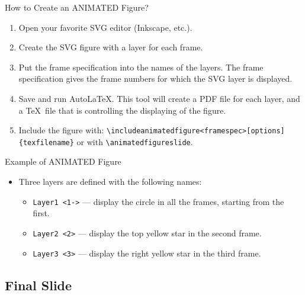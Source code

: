 \documentclass[english,sectioncirclenumberstyle]{le2iutbmbeamer}
\begin{document}
\begin{frame}{How to Create an ANIMATED Figure?}
	\smaller
	\begin{enumerate}
	\item Open your favorite SVG editor (Inkscape, etc.).
	\item Create the SVG figure with a layer for each frame.
	\item Put the frame specification into the names of the layers. The frame specification gives the frame numbers for which the SVG layer is displayed. 
	\item Save and run AutoLaTeX. This tool will create a PDF file for each layer, and a \TeX\ file that is controlling the displaying of the figure.
	\item Include the figure with: \texttt{{\textbackslash}includeanimatedfigure<framespec>[options]\{texfilename\}} or with \texttt{{\textbackslash}animatedfigureslide}.
	\end{enumerate}
\end{frame}

\begin{frame}{Example of ANIMATED Figure}
	\begin{itemize}
	\item Three layers are defined with the following names:
		\begin{itemize}
		\item \texttt{Layer1 <1->} --- display the circle in all the frames, starting from the first.
		\item \texttt{Layer2 <2>} --- display the top yellow star in the second frame.
		\item \texttt{Layer3 <3>} --- display the right yellow star in the third frame.
		\end{itemize}
	\end{itemize}
	\begin{center}
	\end{center}
\end{frame}

\subsection{Final Slide}
\end{document}
